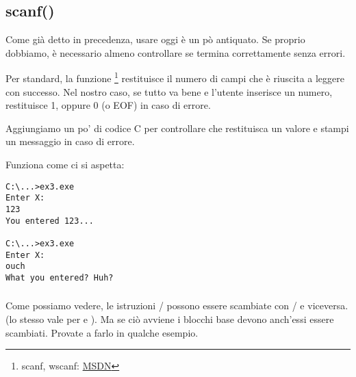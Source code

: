 \subsection{scanf()}

Come già detto in precedenza, usare \scanf oggi è un pò antiquato.
Se proprio dobbiamo, è necessario almeno controllare se \scanf termina correttamente senza errori.



Per standard, la funzione \scanf\footnote{scanf, wscanf: \href{http://go.yurichev.com/17255}{MSDN}} restituisce il numero di campi che è riuscita a leggere con successo.
Nel nostro caso, se tutto va bene e l'utente inserisce un numero, \scanf restituisce 1, oppure 0 (o \ac{EOF}) in caso di errore. 

Aggiungiamo un po' di codice C per controllare che \scanf restituisca un valore e stampi un messaggio in caso di errore.

Funziona come ci si aspetta:

\begin{lstlisting}
C:\...>ex3.exe
Enter X:
123
You entered 123...

C:\...>ex3.exe
Enter X:
ouch
What you entered? Huh?
\end{lstlisting}






\subsubsection{\Exercise}

Come possiamo vedere, le istruzioni / possono essere scambiate con / e viceversa.
(lo stesso vale per  e ).
Ma se ciò avviene i blocchi base devono anch'essi essere scambiati. Provate a farlo in qualche esempio.

